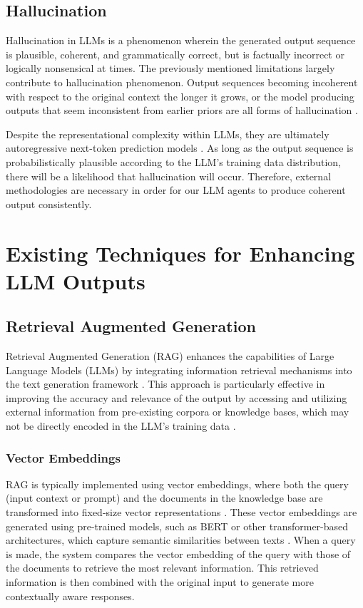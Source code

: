 \subsection{Hallucination}

Hallucination in LLMs is a phenomenon wherein the generated output sequence is plausible, coherent, and grammatically correct, but is factually incorrect or logically nonsensical at times. The previously mentioned limitations largely contribute to hallucination phenomenon. Output sequences becoming incoherent with respect to the original context the longer it grows, or the model producing outputs that seem inconsistent from earlier priors are all forms of hallucination \cite{huangSurveyHallucinationLarge2025}. 

Despite the representational complexity within LLMs, they are ultimately autoregressive next-token prediction models \cite{vaswaniAttentionAllYou2023}. As long as the output sequence is probabilistically plausible according to the LLM's training data distribution, there will be a likelihood that hallucination will occur. Therefore, external methodologies are necessary in order for our LLM agents to produce coherent output consistently. 

\section{Existing Techniques for Enhancing LLM Outputs}
\subsection{Retrieval Augmented Generation}

Retrieval Augmented Generation (RAG) enhances the capabilities of Large Language Models (LLMs) by integrating information retrieval mechanisms into the text generation framework \cite{lewisRetrievalAugmentedGenerationKnowledgeIntensive2021}. This approach is particularly effective in improving the accuracy and relevance of the output by accessing and utilizing external information from pre-existing corpora or knowledge bases, which may not be directly encoded in the LLM's training data \cite{gaoRetrievalAugmentedGenerationLarge2024}.

\subsubsection{Vector Embeddings}
RAG is typically implemented using vector embeddings, where both the query (input context or prompt) and the documents in the knowledge base are transformed into fixed-size vector representations \cite{lewisRetrievalAugmentedGenerationKnowledgeIntensive2021}. These vector embeddings are generated using pre-trained models, such as BERT or other transformer-based architectures, which capture semantic similarities between texts \cite{lewisRetrievalAugmentedGenerationKnowledgeIntensive2021, gaoRetrievalAugmentedGenerationLarge2024}. When a query is made, the system compares the vector embedding of the query with those of the documents to retrieve the most relevant information. This retrieved information is then combined with the original input to generate more contextually aware responses.

